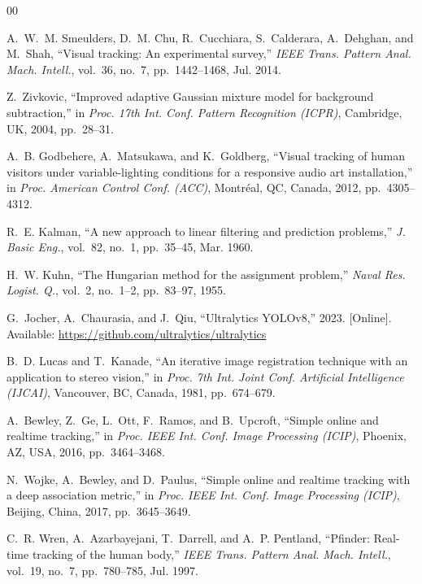 \documentclass[10pt, conference, compsocconf]{IEEEtran}
\begin{document}
\balance
\begin{thebibliography}{00}

A.~W.~M. Smeulders, D.~M. Chu, R.~Cucchiara, S.~Calderara,
A.~Dehghan, and M.~Shah,
``Visual tracking: An experimental survey,''
\emph{IEEE Trans. Pattern Anal. Mach. Intell.},
vol.~36, no.~7, pp.~1442--1468, Jul. 2014.

Z.~Zivkovic,
``Improved adaptive Gaussian mixture model for background
subtraction,''
in \emph{Proc. 17th Int. Conf. Pattern Recognition (ICPR)},
Cambridge, UK, 2004, pp.~28--31.

A.~B. Godbehere, A.~Matsukawa, and K.~Goldberg,
``Visual tracking of human visitors under variable-lighting
conditions for a responsive audio art installation,''
in \emph{Proc. American Control Conf. (ACC)},
Montr\'{e}al, QC, Canada, 2012, pp.~4305--4312.

R.~E. Kalman,
``A new approach to linear filtering and prediction problems,''
\emph{J. Basic Eng.}, vol.~82, no.~1, pp.~35--45, Mar. 1960.

H.~W. Kuhn,
``The Hungarian method for the assignment problem,''
\emph{Naval Res. Logist. Q.}, vol.~2, no.~1--2, pp.~83--97, 1955.

G.~Jocher, A.~Chaurasia, and J.~Qiu,
``Ultralytics YOLOv8,''
2023. [Online]. Available: \url{https://github.com/ultralytics/ultralytics}

B.~D. Lucas and T.~Kanade,
``An iterative image registration technique with an application to
stereo vision,''
in \emph{Proc. 7th Int. Joint Conf. Artificial Intelligence (IJCAI)},
Vancouver, BC, Canada, 1981, pp.~674--679.

A.~Bewley, Z.~Ge, L.~Ott, F.~Ramos, and B.~Upcroft,
``Simple online and realtime tracking,''
in \emph{Proc. IEEE Int. Conf. Image Processing (ICIP)},
Phoenix, AZ, USA, 2016, pp.~3464--3468.

N.~Wojke, A.~Bewley, and D.~Paulus,
``Simple online and realtime tracking with a deep association metric,''
in \emph{Proc. IEEE Int. Conf. Image Processing (ICIP)},
Beijing, China, 2017, pp.~3645--3649.

C.~R. Wren, A.~Azarbayejani, T.~Darrell, and A.~P. Pentland,
``Pfinder: Real-time tracking of the human body,''
\emph{IEEE Trans. Pattern Anal. Mach. Intell.},
vol.~19, no.~7, pp.~780--785, Jul. 1997.


\end{thebibliography}
\end{document}
